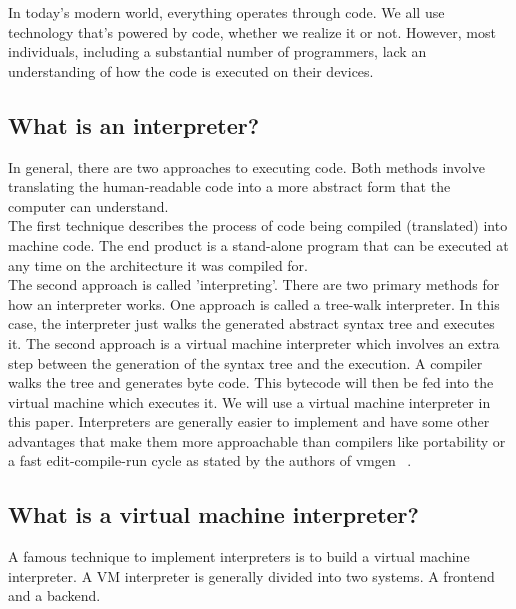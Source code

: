 \documentclass{article}
\begin{document}

In today's modern world, everything operates through code. We all use
technology that's powered by code, whether we realize it or not. However, most
individuals, including a substantial number of programmers, lack an
understanding of how the code is executed on their devices.

\subsection{What is an interpreter?}

In general, there are two approaches to executing code. Both methods involve
translating the human-readable code into a more abstract form that the computer
can understand. \\

The first technique describes the process of code being compiled (translated)
into machine code. The end product is a stand-alone program that can be
executed at any time on the architecture it was compiled for. \\

The second approach is called 'interpreting'. There are two primary methods for
how an interpreter works. One approach is called a tree-walk interpreter. In
this case, the interpreter just walks the generated abstract syntax tree and
executes it. The second approach is a virtual machine interpreter which
involves an extra step between the generation of the syntax tree and the
execution. A compiler walks the tree and generates byte code. This bytecode
will then be fed into the virtual machine which executes it. We will use a
virtual machine interpreter in this paper. Interpreters are generally easier to
implement and have some other advantages that make them more approachable than
compilers like portability or a fast edit-compile-run cycle as stated by the
authors of vmgen ~\cite{vmgen}. 

\subsection{What is a virtual machine interpreter?}
A famous technique to implement interpreters is to build a virtual machine
interpreter. A VM interpreter is generally divided into two systems. A frontend
and a backend. ~\cite{vmgen} \\
\end{document}
